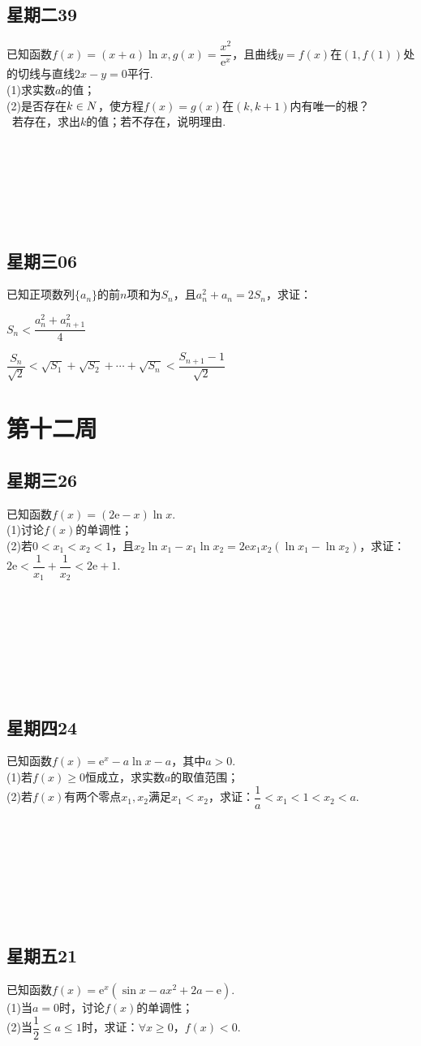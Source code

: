 \documentclass[UTF8,a4paper,11 pt]{ctexart}%
\newcommand\eu{\mathrm{e}}%
\let\mathbb\relax
\begin{document}
	\subsection{星期二39}\noindent
	已知函数$ f(x)=(x+a)\ln x, g(x)=\dfrac{x^2}{\eu^x} $，且曲线$ y=f(x) $在$ \left(1,f(1)\right) $处的切线与直线$ 2x-y=0 $平行.
	\\(1)求实数$ a $的值；
	\\(2)是否存在$ k\in\mathbb{N} $，使方程$ f(x)=g(x) $在$ (k,k+1) $内有唯一的根？
	\\\mbox{\quad\,} 若存在，求出$ k $的值；若不存在，说明理由. 
	\\\,\\\,\\\,\\\,\\\,\\\,
	\subsection{星期三06}\noindent
	已知正项数列$ \{a_n\} $的前$ n $项和为$ S_n $，且$ a_n^2+a_n=2S_n $，求证：\begin{xchoices}[label-style=quan,items=1]
	\item $ S_n<\dfrac{a_n^2+a_{n+1}^2}{4} $
	\item $ \dfrac{S_n}{\sqrt{2}}<\sqrt{S_1}+\sqrt{S_2}+\cdots+\sqrt{S_n}<\dfrac{S_{n+1}-1}{\sqrt{2}} $
	\end{xchoices}
	\section{第十二周}
	\subsection{星期三26}\noindent
	已知函数$ f(x)=(2\eu-x)\ln x $.
	\\(1)讨论$ f(x) $的单调性；
	\\(2)若$ 0<x_1<x_2<1 $，且$ x_2\ln x_1-x_1\ln x_2=2\eu x_1x_2(\ln x_1-\ln x_2) $，求证：$ 2\eu<\dfrac{1}{x_1}+\dfrac{1}{x_2}<2\eu+1 $.
	\\\,\\\,\\\,\\\,\\\,\\\,\\\,
	\subsection{星期四24}\noindent
	已知函数$ f(x)=\eu^x-a\ln x-a $，其中$ a>0 $.
	\\(1)若$ f(x)\ge0 $恒成立，求实数$ a $的取值范围；
	\\(2)若$ f(x) $有两个零点$ x_1,x_2 $满足$ x_1<x_2 $，求证：$ \dfrac{1}{a}<x_1<1<x_2<a $.
	\\\,\\\,\\\,\\\,\\\,\\\,\\\,
	\subsection{星期五21}\noindent
	已知函数$ f(x)=\eu^x(\sin x-ax^2+2a-\eu) $.
	\\(1)当$ a=0 $时，讨论$ f(x) $的单调性；
	\\(2)当$ \dfrac{1}{2}\le a\le 1 $时，求证：$ \forall x\ge0 $，$ f(x)<0 $.
\end{document}
